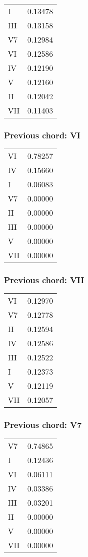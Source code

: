 \begin{tabular}{l l}
I & 0.13478 \\
III & 0.13158 \\
V7 & 0.12984 \\
VI & 0.12586 \\
IV & 0.12190 \\
V & 0.12160 \\
II & 0.12042 \\
VII & 0.11403 \\
\end{tabular}


\subsubsection*{Previous chord: VI}


\begin{tabular}{l l}
VI & 0.78257 \\
IV & 0.15660 \\
I & 0.06083 \\
V7 & 0.00000 \\
II & 0.00000 \\
III & 0.00000 \\
V & 0.00000 \\
VII & 0.00000 \\
\end{tabular}


\subsubsection*{Previous chord: VII}


\begin{tabular}{l l}
VI & 0.12970 \\
V7 & 0.12778 \\
II & 0.12594 \\
IV & 0.12586 \\
III & 0.12522 \\
I & 0.12373 \\
V & 0.12119 \\
VII & 0.12057 \\
\end{tabular}


\subsubsection*{Previous chord: V7}


\begin{tabular}{l l}
V7 & 0.74865 \\
I & 0.12436 \\
VI & 0.06111 \\
IV & 0.03386 \\
III & 0.03201 \\
II & 0.00000 \\
V & 0.00000 \\
VII & 0.00000 \\
\end{tabular}

